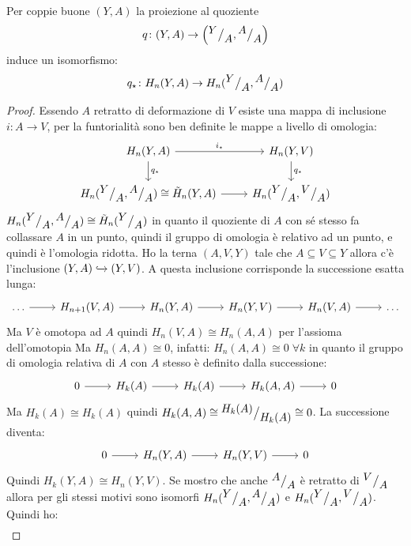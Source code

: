 \begin{lemma}
  Per coppie buone $ (Y,A) $ la proiezione al quoziente
  \[
    q \colon (Y,A) \to \left({^{\textstyle Y}\big/_{\textstyle A}}, {^{\textstyle A}\big/_{\textstyle A}} \right)
  \]
  induce un isomorfismo:
  \[
    q_\star \colon H_n(Y,A) \to  H_n({^{\textstyle Y}\big/_{\textstyle A}}, {^{\textstyle A}\big/_{\textstyle A}})
  \]
\end{lemma}
\begin{proof}
  Essendo $ A $ retratto di deformazione di $ V $ esiste
  una mappa di inclusione $ i \colon A \to V $, per la funtorialità
  sono ben definite le mappe a livello di omologia:
  \[
    \begin{tikzcd}
      H_n(Y,A) \rar{i_\star} \dar{q_\star} & H_n(Y,V) \dar{q_\star} \\
      H_n(\quot{Y}{A}, \quot{A}{A}) \cong \tilde{H}_n(Y,A) \rar & H_n(\quot{Y}{A}, \quot{V}{A})
    \end{tikzcd}
  \]
  $  H_n({^{\textstyle Y}\big/_{\textstyle A}}, {^{\textstyle A}\big/_{\textstyle A}}) \cong \tilde{H}_n({^{\textstyle Y}\big/_{\textstyle A}}) $ in quanto il quoziente
  di $ A $ con sé stesso fa collassare $ A $ in un punto, quindi il gruppo di omologia
  è relativo ad un punto, e quindi è l'omologia ridotta.
  Ho la terna $ (A, V, Y) $ tale che $ A \subseteq V \subseteq Y $ allora c'è l'inclusione
  $ (Y,A) \xhookrightarrow{} (Y,V) $. A questa inclusione corrisponde la successione esatta lunga:
  \[
    \begin{tikzcd}
      \dots \rar & H_{n+1}(V, A) \rar & H_n(Y, A) \rar & H_n(Y,V) \rar & H_{n}(V,A) \rar & \dots
    \end{tikzcd}
  \]
  Ma $ V $ è omotopa ad $ A $ quindi $ H_n(V,A) \cong H_n(A,A) $ per l'assioma dell'omotopia
  Ma $ H_n(A,A) \cong 0 $, infatti:
  $ H_n(A,A) \cong 0 \; \forall k $ in quanto il gruppo di omologia relativa
  di $ A $ con $ A $ stesso è definito dalla successione:
  \[
    \begin{tikzcd}
      0 \rar   & H_k(A) \rar  & H_k(A) \rar  & H_k(A,A) \rar & 0
    \end{tikzcd}
  \]
  Ma $ H_k(A) \cong H_k(A) $ quindi  $ H_k(A,A) \cong {^{\textstyle H_k(A)}\big/_{\textstyle H_k(A)}} \cong 0 $.
  La successione diventa:
  \[
    \begin{tikzcd}
      0 \rar & H_n(Y, A) \rar & H_n(Y,V) \rar & 0
    \end{tikzcd}
  \]
  Quindi $ H_k(Y,A) \cong H_n(Y,V) $.
  Se mostro che anche $ {^{\textstyle A}\big/_{\textstyle A}} $ è retratto di $ {^{\textstyle V}\big/_{\textstyle A}} $
  allora per  gli stessi motivi sono isomorfi
  $ H_n({^{\textstyle Y}\big/_{\textstyle A}}, {^{\textstyle A}\big/_{\textstyle A}}) $ e $ H_n({^{\textstyle Y}\big/_{\textstyle A}}, {^{\textstyle V}\big/_{\textstyle A}}) $.
  Quindi ho:
  \begin{align*}

\end{align*}
\end{proof}
